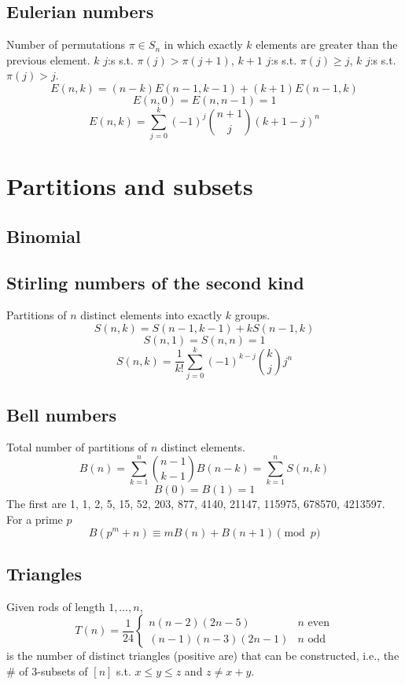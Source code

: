 		\subsection{Eulerian numbers}
			Number of permutations $\pi \in S_n$ in which exactly $k$ elements are greater than the previous element. $k$ $j$:s s.t. $\pi(j)>\pi(j+1)$, $k+1$ $j$:s s.t. $\pi(j)\geq j$, $k$ $j$:s s.t. $\pi(j)>j$.
			$$E(n,k) = (n-k)E(n-1,k-1) + (k+1)E(n-1,k)$$
			$$E(n,0) = E(n,n-1) = 1$$
			$$E(n,k) = \sum_{j=0}^k(-1)^j\binom{n+1}{j}(k+1-j)^n$$
	
	\section{Partitions and subsets}
		\subsection{Binomial}

		\subsection{Stirling numbers of the second kind}
			Partitions of $n$ distinct elements into exactly $k$ groups.
			$$S(n,k) = S(n-1,k-1) + k S(n-1,k)$$
			$$S(n,1) = S(n,n) = 1$$
			$$S(n,k) = \frac{1}{k!}\sum_{j=0}^k (-1)^{k-j}\binom{k}{j}j^n$$

		\subsection{Bell numbers}
			Total number of partitions of $n$ distinct elements.
			$$B(n) = \sum_{k=1}^n \binom{n-1}{k-1}B(n-k) = \sum_{k=1}^n S(n,k)$$
			$$B(0) = B(1) = 1$$
			The first are 1, 1, 2, 5, 15, 52, 203, 877, 4140, 21147, 115975, 678570, 4213597.
			For a prime $p$
			$$B(p^m+n)\equiv mB(n)+B(n+1) \pmod{p}$$

		\subsection{Triangles}
			Given rods of length $1,\ldots,n$,
			$$T(n) = \frac{1}{24} \left\{\begin{array}{ll}n(n-2)(2n-5) & n \text{ even}\\(n-1)(n-3)(2n-1) & n \text{ odd}\end{array}\right.$$
			is the number of distinct triangles (positive are) that can be constructed, i.e., the \# of 3-subsets of $[n]$ s.t. $x\leq y\leq z$ and $z\neq x+y$.

